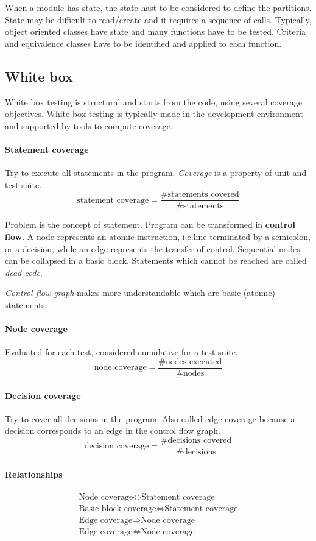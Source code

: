 When a module has state, the state hast to be considered to define the partitions. State may be difficult to read/create and it requires a sequence of calls. Typically, object oriented classes have state and many functions have to be tested. Criteria and equivalence classes have to be identified and applied to each function.

\subsection{White box}
White box testing is structural and starts from the code, using several coverage objectives. White box testing is typically made in the development environment and supported by tools to compute coverage.

\paragraph{Statement coverage} Try to execute all statements in the program. \emph{Coverage} is a property of unit and test suite.
\[
\text{statement coverage} = \dfrac{\text{\# statements covered}}{\text{\# statements}}
\]

Problem is the concept of statement. Program can be transformed in \textbf{control flow}. A node represents an atomic instruction, i.e.\@ line terminated by a semicolon, or a decision, while an edge represents the transfer of control. Sequential nodes can be collapsed in a basic block. Statements which cannot be reached are called \emph{dead code}.

\emph{Control flow graph} makes more understandable which are basic (atomic) statements.

\paragraph{Node coverage} Evaluated for each test, considered cumulative for a test suite.
\[
\text{node coverage} = \dfrac{\text{\# nodes executed}}{\text{\# nodes}}
\]

\paragraph{Decision coverage} Try to cover all decisions in the program. Also called edge coverage because a decision corresponds to an edge in the control flow graph.
\[
\text{decision coverage} = \dfrac{\text{\# decisions covered}}{\text{\# decisions}}
\]

\paragraph{Relationships}
\begin{gather*}
\text{Node coverage} \Leftrightarrow \text{Statement coverage} \\
\text{Basic block coverage} \Leftrightarrow \text{Statement coverage} \\
\text{Edge coverage} \Rightarrow \text{Node coverage} \\
\text{Edge coverage} \nLeftarrow \text{Node coverage}
\end{gather*}

